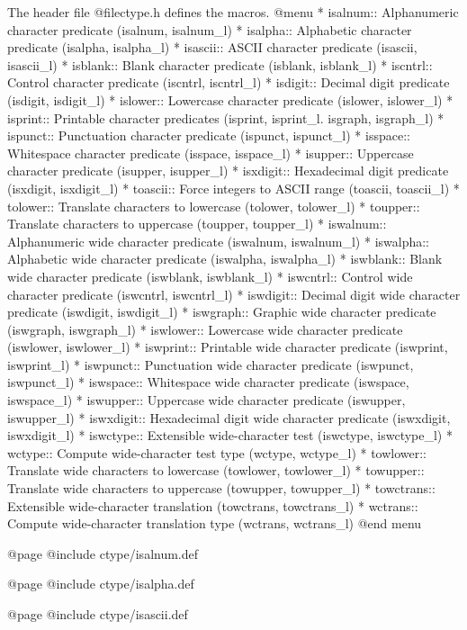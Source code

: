 The header file @file{ctype.h} defines the macros.
@menu
* isalnum::   Alphanumeric character predicate (isalnum, isalnum_l)
* isalpha::   Alphabetic character predicate (isalpha, isalpha_l)
* isascii::   ASCII character predicate (isascii, isascii_l)
* isblank::   Blank character predicate (isblank, isblank_l)
* iscntrl::   Control character predicate (iscntrl, iscntrl_l)
* isdigit::   Decimal digit predicate (isdigit, isdigit_l)
* islower::   Lowercase character predicate (islower, islower_l)
* isprint::   Printable character predicates (isprint, isprint_l. isgraph, isgraph_l)
* ispunct::   Punctuation character predicate (ispunct, ispunct_l)
* isspace::   Whitespace character predicate (isspace, isspace_l)
* isupper::   Uppercase character predicate (isupper, isupper_l)
* isxdigit::  Hexadecimal digit predicate (isxdigit, isxdigit_l)
* toascii::   Force integers to ASCII range (toascii, toascii_l)
* tolower::   Translate characters to lowercase (tolower, tolower_l)
* toupper::   Translate characters to uppercase (toupper, toupper_l)
* iswalnum::  Alphanumeric wide character predicate (iswalnum, iswalnum_l)
* iswalpha::  Alphabetic wide character predicate (iswalpha, iswalpha_l)
* iswblank::  Blank wide character predicate (iswblank, iswblank_l)
* iswcntrl::  Control wide character predicate (iswcntrl, iswcntrl_l)
* iswdigit::  Decimal digit wide character predicate (iswdigit, iswdigit_l)
* iswgraph::  Graphic wide character predicate (iswgraph, iswgraph_l)
* iswlower::  Lowercase wide character predicate (iswlower, iswlower_l)
* iswprint::  Printable wide character predicate (iswprint, iswprint_l)
* iswpunct::  Punctuation wide character predicate (iswpunct, iswpunct_l)
* iswspace::  Whitespace wide character predicate (iswspace, iswspace_l)
* iswupper::  Uppercase wide character predicate (iswupper, iswupper_l)
* iswxdigit:: Hexadecimal digit wide character predicate (iswxdigit, iswxdigit_l)
* iswctype::  Extensible wide-character test (iswctype, iswctype_l)
* wctype::    Compute wide-character test type (wctype, wctype_l)
* towlower::  Translate wide characters to lowercase (towlower, towlower_l)
* towupper::  Translate wide characters to uppercase (towupper, towupper_l)
* towctrans:: Extensible wide-character translation (towctrans, towctrans_l)
* wctrans::   Compute wide-character translation type (wctrans, wctrans_l)
@end menu

@page
@include ctype/isalnum.def

@page
@include ctype/isalpha.def

@page
@include ctype/isascii.def

